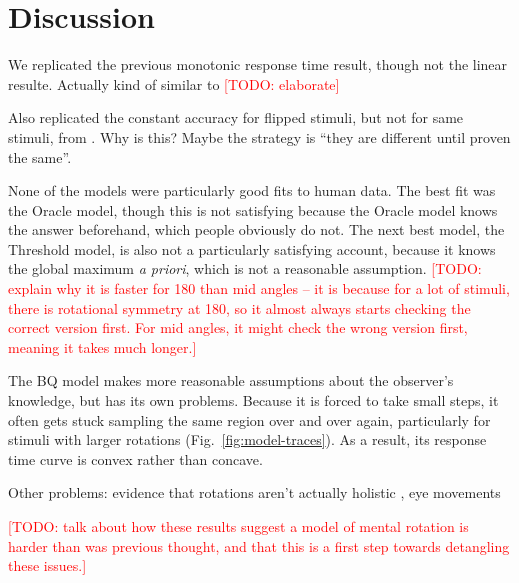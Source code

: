 \documentclass[10pt,letterpaper]{article}
\newcommand{\TODO}[1]{\textcolor{red}{[TODO: #1]}}
\newcommand{\Oc}[0]{Oracle}
\newcommand{\Th}[0]{Threshold}
\newcommand{\Bq}[0]{BQ}
\begin{document}
\section{Discussion}

We replicated the previous monotonic response time result, though not
the linear resulte. Actually kind of similar to \cite{Gardony:2013gn}
\TODO{elaborate}

Also replicated the constant accuracy for flipped stimuli, but not for
same stimuli, from \cite{Cooper:1975wp}. Why is this? Maybe the
strategy is ``they are different until proven the same''.

None of the models were particularly good fits to human data. The best
fit was the \Oc{} model, though this is not satisfying because the
\Oc{} model knows the answer beforehand, which people obviously do
not. The next best model, the \Th{} model, is also not a
particularly satisfying account, because it knows the global maximum
\textit{a priori}, which is not a reasonable assumption. \TODO{explain
  why it is faster for 180 than mid angles -- it is because for a lot
  of stimuli, there is rotational symmetry at 180, so it almost always
  starts checking the correct version first. For mid angles, it might
  check the wrong version first, meaning it takes much longer.}

The \Bq{} model makes more reasonable assumptions about the observer's
knowledge, but has its own problems. Because it is forced to take
small steps, it often gets stuck sampling the same region over and
over again, particularly for stimuli with larger rotations
(Fig.~\ref{fig:model-traces}). As a result, its response time curve is
convex rather than concave.

Other problems: evidence that rotations aren't actually holistic
\cite{Yuille:1982tx}, eye movements \cite{Just1976}

\TODO{talk about how these results suggest a model of mental rotation
  is harder than was previous thought, and that this is a first step
  towards detangling these issues.}




\renewcommand{\bibliographytypesize}{\small}
\setlength{\bibleftmargin}{.125in}
\setlength{\bibindent}{-\bibleftmargin}

\end{document}
